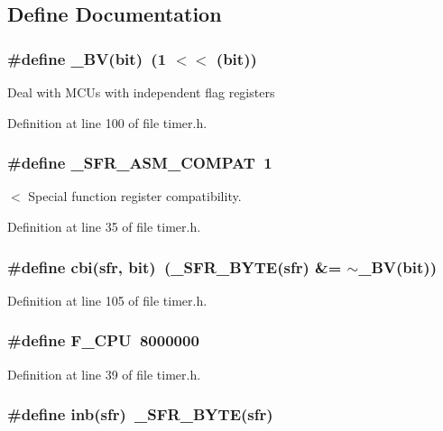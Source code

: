 \subsection{Define Documentation}
\subsubsection{\setlength{\rightskip}{0pt plus 5cm}\#define \_\-BV(bit)~(1 $<$$<$ (bit))}\label{timer_8h_11643f271076024c395a93800b3d9546}


Deal with MCUs with independent flag registers 

Definition at line 100 of file timer.h.
\subsubsection{\setlength{\rightskip}{0pt plus 5cm}\#define \_\-SFR\_\-ASM\_\-COMPAT~1}\label{timer_8h_2a26f53e350366af6e573b70ef4036cd}


$<$ Special function register compatibility. 

Definition at line 35 of file timer.h.
\subsubsection{\setlength{\rightskip}{0pt plus 5cm}\#define cbi(sfr, bit)~(\_\-SFR\_\-BYTE(sfr) \&= $\sim$\_\-BV(bit))}\label{timer_8h_e70baf5399951da1e7ad45a0ed890832}




Definition at line 105 of file timer.h.
\subsubsection{\setlength{\rightskip}{0pt plus 5cm}\#define F\_\-CPU~8000000}\label{timer_8h_43bafb28b29491ec7f871319b5a3b2f8}




Definition at line 39 of file timer.h.
\subsubsection{\setlength{\rightskip}{0pt plus 5cm}\#define inb(sfr)~\_\-SFR\_\-BYTE(sfr)}\label{timer_8h_5f2f31448ae0df9a545e0ca95e748f16}





